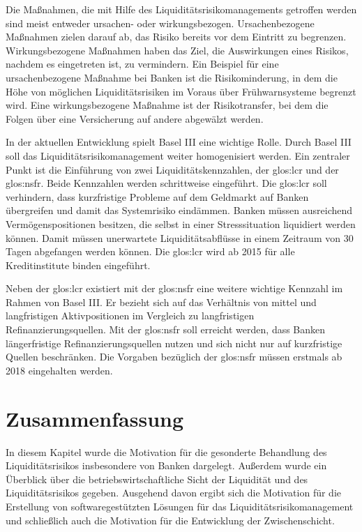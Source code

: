 \begin{onehalfspacing}
Die Maßnahmen, die mit Hilfe des Liquiditätsrisikomanagements getroffen werden sind meist entweder ursachen- oder wirkungsbezogen. Ursachenbezogene Maßnahmen zielen darauf ab, das Risiko bereits vor dem Eintritt zu begrenzen. Wirkungsbezogene Maßnahmen haben das Ziel, die Auswirkungen eines Risikos, nachdem es eingetreten ist, zu vermindern. Ein Beispiel für eine ursachenbezogene Maßnahme bei Banken ist die Risikominderung, in dem die Höhe von möglichen Liquiditätsrisiken im Voraus über Frühwarnsysteme begrenzt wird. Eine wirkungsbezogene Maßnahme ist der Risikotransfer, bei dem die Folgen über eine Versicherung auf andere abgewälzt werden.


In der aktuellen Entwicklung spielt Basel III eine wichtige Rolle. Durch Basel III soll das Liquiditätsrisikomanagement weiter homogenisiert werden. Ein zentraler Punkt ist die Einführung von zwei Liquiditätskennzahlen, der \gls{glos:lcr} und der \gls{glos:nsfr}. Beide Kennzahlen werden schrittweise eingeführt. Die \gls{glos:lcr} soll verhindern, dass kurzfristige Probleme auf dem Geldmarkt auf Banken übergreifen und damit das Systemrisiko eindämmen. Banken müssen ausreichend Vermögenspositionen besitzen, die selbst in einer Stresssituation liquidiert werden können. Damit müssen unerwartete Liquiditätsabflüsse in einem Zeitraum von 30 Tagen abgefangen werden können. Die \gls{glos:lcr} wird ab 2015 für alle Kreditinstitute binden eingeführt.

Neben der \gls{glos:lcr} existiert mit der \gls{glos:nsfr} eine weitere wichtige Kennzahl im Rahmen von Basel III. Er bezieht sich auf das Verhältnis von mittel und langfristigen Aktivpositionen im Vergleich zu langfristigen Refinanzierungsquellen. Mit der \gls{glos:nsfr} soll erreicht werden, dass Banken längerfristige Refinanzierungsquellen nutzen und sich nicht nur auf kurzfristige Quellen beschränken. Die Vorgaben bezüglich der \gls{glos:nsfr} müssen erstmals ab 2018 eingehalten werden.

\section{Zusammenfassung}
In diesem Kapitel wurde die Motivation für die gesonderte Behandlung des Liquiditätsrisikos insbesondere von Banken dargelegt. Außerdem wurde ein Überblick über die betriebswirtschaftliche Sicht der Liquidität und des Liquiditätsrisikos gegeben. Ausgehend davon ergibt sich die Motivation für die Erstellung von softwaregestützten Lösungen für das Liquiditätsrisikomanagement und schließlich auch die Motivation für die Entwicklung der Zwischenschicht.


\end{onehalfspacing}
